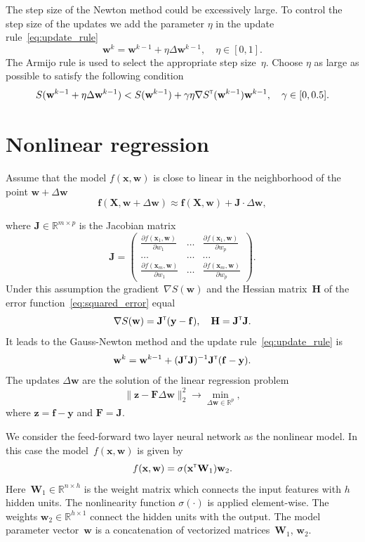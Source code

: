 \documentclass[
11pt,%
tightenlines,%
twoside,%
onecolumn,%
nofloats,%
nobibnotes,%
nofootinbib,%
superscriptaddress,%
noshowpacs,%
centertags]%
{revtex4}
\newcommand{\bw}{\mathbf{w}}
\newcommand{\by}{\mathbf{y}}
\newcommand{\bx}{\mathbf{x}}
\newcommand{\bz}{\mathbf{z}}
\newcommand{\bJ}{\mathbf{J}}
\newcommand{\bbR}{\mathbb{R}}
\newcommand{\bW}{\mathbf{W}}
\newcommand{\bH}{\mathbf{H}}
\newcommand{\bF}{\mathbf{F}}
\newcommand{\bX}{\mathbf{X}}
\newcommand{\T}{{\text{\tiny\sffamily\upshape\mdseries T}}}
\begin{document}
The step size of the Newton method could be excessively large. To control the step size of the updates we add the parameter $\eta$ in the update rule~\eqref{eq:update_rule}
\[
\bw^k = \bw^{k - 1} + \eta \Delta \bw^{k - 1}, \quad \eta \in [0, 1].
\]
The Armijo rule is used to select the appropriate step size~$\eta$. Choose $\eta$ as large as possible to satisfy the following condition
\[
S(\bw^{k - 1} + \eta \Delta \bw^{k - 1}) < S(\bw^{k - 1}) + \gamma \eta \nabla S^{\T}(\bw^{k-1})\bw^{k - 1}, \quad \gamma \in [0, 0.5].
\]

\section{Nonlinear regression}
	Assume that the model $f(\bx , \bw)$ is close to linear in the neighborhood of the point $\bw + \Delta \bw$
\[
\mathbf{f}(\bX , \bw + \Delta \bw) \approx \mathbf{f}(\bX , \bw) + \bJ \cdot \Delta  \bw,
\]

where $\mathbf{J} \in \bbR^{m \times p}$ is the Jacobian matrix
\begin{equation}
\bJ = 
\begin{pmatrix}
\frac{\partial f(\bx_1 , \bw)}{\partial w_1} & \dots & 
\frac{\partial f(\bx_1 , \bw)}{\partial w_p} \\
\dots & \dots & \dots \\
\frac{\partial f(\bx_m , \bw)}{\partial w_1} & \dots & 
\frac{\partial f(\bx_m , \bw)}{\partial w_p}
\end{pmatrix}.
\end{equation}
Under this assumption the gradient~$\nabla S(\bw)$ and the Hessian matrix~$\bH$ of the error function~\eqref{eq:squared_error} equal
\begin{equation}
\nabla S(\bw) = \bJ^{\T} (\by - \mathbf{f}), \quad \bH = \bJ^{\T} \bJ.
\label{eq:nonlin_reg_deriv}
\end{equation}
It leads to the Gauss-Newton method and the update rule~\eqref{eq:update_rule} is 
\[
\bw^k = \bw^{k - 1} + (\bJ^{\T} \bJ)^{-1}\bJ^{\T}(\mathbf{f} - \by).
\]
The updates $\Delta \bw$ are the solution of the linear regression problem
\begin{equation}
\| \bz - \bF \Delta \bw \|_2^2 \rightarrow \min_{\Delta \bw \in \bbR^{p}},
\label{eq:lin_reg_nonlin_reg}
\end{equation}
where $\bz = \mathbf{f} - \by$ and $\bF = \bJ$.

We consider the feed-forward two layer neural network as the nonlinear model. In this case the model~$f(\bx, \bw)$ is given by
\[
f(\bx, \bw) = \sigma(\bx^{\T} \bW_1) \bw_2.
\]
Here~$\bW_1 \in \bbR^{n \times h}$ is the weight matrix which connects the input features with $h$ hidden units. The nonlinearity function $\sigma(\cdot)$ is applied element-wise. The weights $\bw_2 \in \bbR^{h \times 1}$ connect the hidden units with the output. 
The model parameter vector~$\bw$ is a concatenation of vectorized matrices~$\bW_1$, $\bw_2$.
\end{document}
